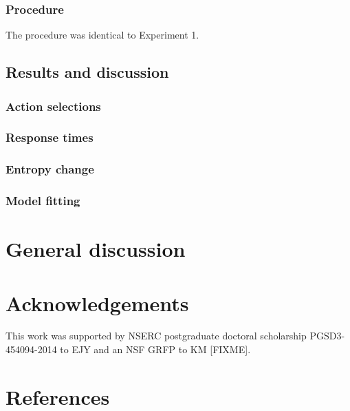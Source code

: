 \documentclass[10pt, letterpaper]{article}
\begin{document}
\subsubsection{Procedure}\label{procedure-1}

The procedure was identical to Experiment 1.

\subsection{Results and discussion}\label{results-and-discussion-1}

\subsubsection{Action selections}\label{action-selections-1}

\subsubsection{Response times}\label{response-times}

\subsubsection{Entropy change}\label{entropy-change}

\subsubsection{Model fitting}\label{model-fitting}

\section{General discussion}\label{general-discussion}

\section{Acknowledgements}\label{acknowledgements}

This work was supported by NSERC postgraduate doctoral scholarship
PGSD3-454094-2014 to EJY and an NSF GRFP to KM {[}FIXME{]}.

\section{References}\label{references}

\setlength{\parindent}{-0.1in} \setlength{\leftskip}{0.125in} \noindent
\end{document}
